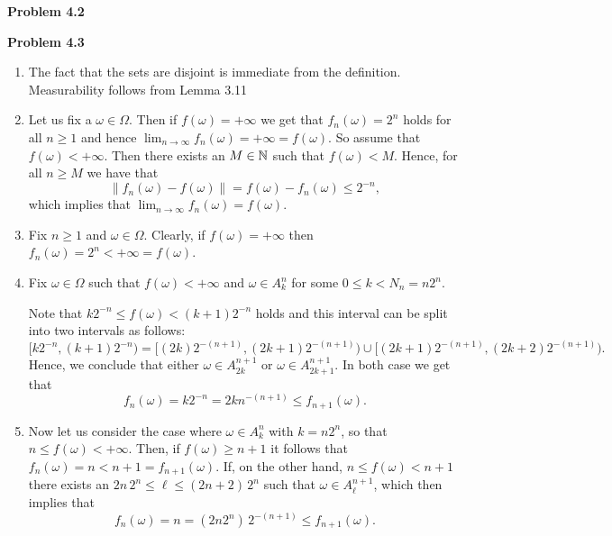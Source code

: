 
\textbf{Problem 4.2}




\bigskip

\textbf{Problem 4.3}

\begin{enumerate}[label={(\alph*)}]
\item The fact that the sets are disjoint is immediate from the definition. Measurability follows from Lemma 3.11
\item Let us fix a $\omega \in \Omega$. Then if $f(\omega) = +\infty$ we get that $f_n(\omega) = 2^n$ holds for all $n \ge 1$ and hence $\lim_{n \to \infty} f_n(\omega) = +\infty = f(\omega)$. So assume that $f(\omega) < +\infty$. Then there exists an $M \in \mathbb N$ such that $f(\omega) < M$. Hence, for all $n \ge M$ we have that 
\[
	\|f_n(\omega) - f(\omega)\| = f(\omega) - f_n(\omega) \le 2^{-n},
\]
which implies that $\lim_{n \to \infty} f_n(\omega) = f(\omega)$.
\item Fix $n \ge 1$ and $\omega \in \Omega$. Clearly, if $f(\omega) = +\infty$ then $f_n(\omega) = 2^n < +\infty = f(\omega)$. 

\item Fix $\omega \in \Omega$ such that $f(\omega) < +\infty$ and $\omega \in A_k^n$ for some $0 \le k < N_n = n 2^n$. 

Note that $k 2^{-n} \le f(\omega) < (k+1) 2^{-n}$ holds and this interval can be split into two intervals as follows:
\[
	[k 2^{-n}, (k+1) 2^{-n}) = [(2k) 2^{-(n+1)}, (2k +1)2^{-(n+1)}) \cup [(2k +1)2^{-(n+1)}, (2k + 2)2^{-(n+1)}).
\] 
Hence, we conclude that either $\omega \in A_{2k}^{n+1}$ or $\omega \in A_{2k+1}^{n+1}$. In both case we get that 
\[
	f_n(\omega) = k2^{-n} = 2k n^{-(n+1)} \le f_{n+1}(\omega).
\]

\item Now let us consider the case where $\omega \in A_k^n$ with $k = n 2^n$, so that $n \le f(\omega) < +\infty$. Then, if $f(\omega) \ge n + 1$ it follows that $f_n(\omega) = n < n + 1 = f_{n+1}(\omega)$. If, on the other hand, $n \le f(\omega) < n + 1$ there exists an $2n \, 2^n \le \ell \le (2n+2) \, 2^n$ such that $\omega \in A_\ell^{n+1}$, which then implies that 
\[
	f_n(\omega) = n = (2n 2^{n}) \, 2^{-(n+1)} \le f_{n+1}(\omega).
\]
\end{enumerate}

\bigskip

